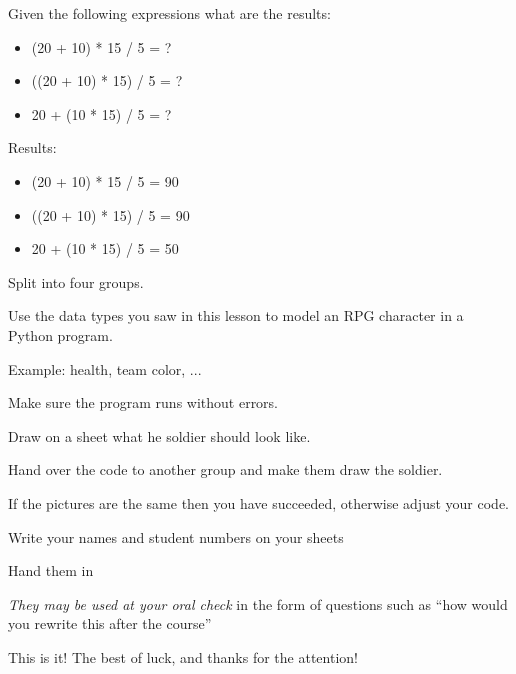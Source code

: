 \documentclass{beamer}
\begin{document}
\begin{slide}{
\item Given the following expressions what are the results:
\begin{itemize}
\item (20 + 10) * 15 / 5 = ?
\item ((20 + 10) * 15) / 5 = ?
\item 20 + (10 * 15) / 5 = ?
\end{itemize}
\pause 
\item Results: 
\begin{itemize}
\item (20 + 10) * 15 / 5 = 90
\item ((20 + 10) * 15) / 5 = 90
\item 20 + (10 * 15) / 5 = 50
\end{itemize}
}\end{slide}


\begin{slide}{
\item Split into four groups.
\item Use the data types you saw in this lesson to model an RPG character in a Python program.
\item Example: health, team color, ...
\item Make sure the program runs without errors.
\item Draw on a sheet what he soldier should look like.
\item Hand over the code to another group and make them draw the soldier.
\item If the pictures are the same then you have succeeded, otherwise adjust your code.
}\end{slide}


\begin{slide}{
\item Write your names and student numbers on your sheets
\item Hand them in
\item \textit{They may be used at your oral check} in the form of questions such as ``how would you rewrite this after the course''
}\end{slide}


\begin{frame}{This is it!}
\center
\fontsize{18pt}{7.2}\selectfont
The best of luck, and thanks for the attention!
\end{frame}
\end{document}
